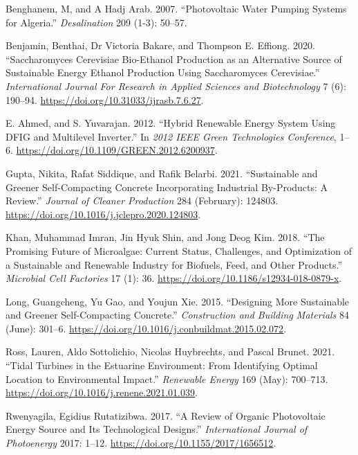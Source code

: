 \documentclass[12pt,twoside]{report}
\begin{document}
\hypertarget{refs}{}
\begin{CSLReferences}{1}{0}
\leavevmode\hypertarget{ref-benghanem2007}{}%
Benghanem, M, and A Hadj Arab. 2007. {``Photovoltaic Water Pumping Systems for {Algeria}.''} \emph{Desalination} 209 (1-3): 50--57.

\leavevmode\hypertarget{ref-benjamin2020}{}%
Benjamin, Benthai, Dr Victoria Bakare, and Thompson E. Effiong. 2020. {``Saccharomyces Cerevisiae {Bio}-{Ethanol Production} as an {Alternative Source} of {Sustainable Energy Ethanol Production} Using {Saccharomyces} Cerevisiae.''} \emph{International Journal For Research in Applied Sciences and Biotechnology} 7 (6): 190--94. \url{https://doi.org/10.31033/ijrasb.7.6.27}.

\leavevmode\hypertarget{ref-e.ahmed2012}{}%
E. Ahmed, and S. Yuvarajan. 2012. {``Hybrid {Renewable Energy System Using DFIG} and {Multilevel Inverter}.''} In \emph{2012 {IEEE Green Technologies Conference}}, 1--6. \url{https://doi.org/10.1109/GREEN.2012.6200937}.

\leavevmode\hypertarget{ref-gupta2021}{}%
Gupta, Nikita, Rafat Siddique, and Rafik Belarbi. 2021. {``Sustainable and {Greener Self}-{Compacting Concrete} Incorporating {Industrial By}-{Products}: A {Review}.''} \emph{Journal of Cleaner Production} 284 (February): 124803. \url{https://doi.org/10.1016/j.jclepro.2020.124803}.

\leavevmode\hypertarget{ref-khan2018}{}%
Khan, Muhammad Imran, Jin Hyuk Shin, and Jong Deog Kim. 2018. {``The Promising Future of Microalgae: Current Status, Challenges, and Optimization of a Sustainable and Renewable Industry for Biofuels, Feed, and Other Products.''} \emph{Microbial Cell Factories} 17 (1): 36. \url{https://doi.org/10.1186/s12934-018-0879-x}.

\leavevmode\hypertarget{ref-long2015}{}%
Long, Guangcheng, Yu Gao, and Youjun Xie. 2015. {``Designing More Sustainable and Greener Self-Compacting Concrete.''} \emph{Construction and Building Materials} 84 (June): 301--6. \url{https://doi.org/10.1016/j.conbuildmat.2015.02.072}.

\leavevmode\hypertarget{ref-ross2021}{}%
Ross, Lauren, Aldo Sottolichio, Nicolas Huybrechts, and Pascal Brunet. 2021. {``Tidal Turbines in the Estuarine Environment: From Identifying Optimal Location to Environmental Impact.''} \emph{Renewable Energy} 169 (May): 700--713. \url{https://doi.org/10.1016/j.renene.2021.01.039}.

\leavevmode\hypertarget{ref-rwenyagila2017}{}%
Rwenyagila, Egidius Rutatizibwa. 2017. {``A {Review} of {Organic Photovoltaic Energy Source} and {Its Technological Designs}.''} \emph{International Journal of Photoenergy} 2017: 1--12. \url{https://doi.org/10.1155/2017/1656512}.


\end{CSLReferences}
\end{document}

